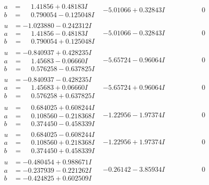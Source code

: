 \documentclass[1p]{elsarticle_modified}
\theoremstyle{definition}
\begin{document}
$$\begin{array}{c|c|c}
\begin{aligned}
a &= \phantom{-}1.41856 + 0.48183 I \\
b &= \phantom{-}0.790054 - 0.125048 I\end{aligned}
 & -5.01066 + 0.32843 I & \phantom{-0.000000 } 0 \\ \hline\begin{aligned}
u &= -1.023880 - 0.242312 I \\
a &= \phantom{-}1.41856 - 0.48183 I \\
b &= \phantom{-}0.790054 + 0.125048 I\end{aligned}
 & -5.01066 - 0.32843 I & \phantom{-0.000000 } 0 \\ \hline\begin{aligned}
u &= -0.840937 + 0.428235 I \\
a &= \phantom{-}1.45683 - 0.06660 I \\
b &= \phantom{-}0.576258 - 0.637825 I\end{aligned}
 & -5.65724 - 0.96064 I & \phantom{-0.000000 } 0 \\ \hline\begin{aligned}
u &= -0.840937 - 0.428235 I \\
a &= \phantom{-}1.45683 + 0.06660 I \\
b &= \phantom{-}0.576258 + 0.637825 I\end{aligned}
 & -5.65724 + 0.96064 I & \phantom{-0.000000 } 0 \\ \hline\begin{aligned}
u &= \phantom{-}0.684025 + 0.608244 I \\
a &= \phantom{-}0.108560 - 0.218368 I \\
b &= \phantom{-}0.374450 - 0.458339 I\end{aligned}
 & -1.22956 - 1.97374 I & \phantom{-0.000000 } 0 \\ \hline\begin{aligned}
u &= \phantom{-}0.684025 - 0.608244 I \\
a &= \phantom{-}0.108560 + 0.218368 I \\
b &= \phantom{-}0.374450 + 0.458339 I\end{aligned}
 & -1.22956 + 1.97374 I & \phantom{-0.000000 } 0 \\ \hline\begin{aligned}
u &= -0.480454 + 0.988671 I \\
a &= -0.237939 - 0.221262 I \\
b &= -0.424825 + 0.602509 I\end{aligned}
 & -0.26142 - 3.85934 I & \phantom{-0.000000 } 0 \\ \hline\begin{aligned}

\end{aligned}
\end{array}$$
\end{document}

